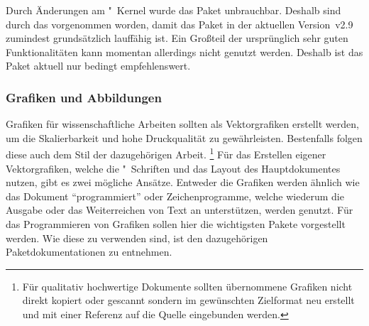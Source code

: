 \begin{packages}
  
  Durch Änderungen am "~Kernel wurde das Paket unbrauchbar. 
  Deshalb sind durch das  vorgenommen worden, damit das Paket in der aktuellen Version~v2.9 zumindest 
  grundsätzlich lauffähig ist. Ein Großteil der ursprünglich sehr guten 
  Funktionalitäten kann momentan allerdings nicht genutzt werden. Deshalb ist 
  das Paket aktuell nur bedingt empfehlenswert.
\end{packages}
%


\subsubsection{Grafiken und Abbildungen}
%
%
Grafiken für wissenschaftliche Arbeiten sollten als Vektorgrafiken erstellt 
werden, um die Skalierbarkeit und hohe Druckqualität zu gewährleisten. 
Bestenfalls folgen diese auch dem Stil der dazugehörigen Arbeit.%
\footnote{%
  Für qualitativ hochwertige Dokumente sollten übernommene Grafiken nicht 
  direkt kopiert oder gescannt sondern im gewünschten Zielformat neu erstellt 
  und mit einer Referenz auf die Quelle eingebunden werden.%
}
Für das Erstellen eigener Vektorgrafiken, welche die "~Schriften 
und das Layout des Hauptdokumentes nutzen, gibt es zwei mögliche Ansätze. 
Entweder die Grafiken werden ähnlich wie das Dokument \enquote{programmiert} 
oder Zeichenprogramme, welche wiederum die Ausgabe oder das Weiterreichen von 
Text an  unterstützen, werden genutzt. Für das Programmieren von 
Grafiken sollen hier die wichtigsten Pakete vorgestellt werden. Wie diese zu 
verwenden sind, ist den dazugehörigen Paketdokumentationen zu entnehmen. 

